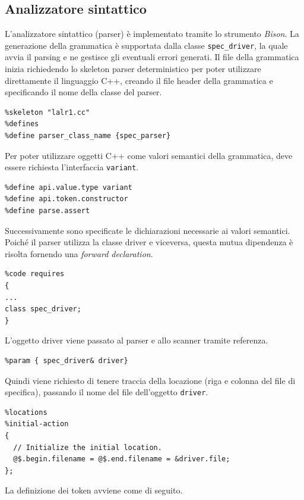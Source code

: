 \subsection{Analizzatore sintattico}
L'analizzatore sintattico (parser) è implementato tramite lo strumento \emph{Bison}. La generazione della grammatica è supportata dalla classe \verb|spec_driver|, la quale avvia il parsing e ne gestisce gli eventuali errori generati.
Il file della grammatica inizia richiedendo lo skeleton parser deterministico per poter utilizzare direttamente il linguaggio C++, creando il file header della grammatica e specificando il nome della classe del parser.

\begin{verbatim}
%skeleton "lalr1.cc"
%defines
%define parser_class_name {spec_parser}
\end{verbatim}

Per poter utilizzare oggetti C++ come valori semantici della grammatica, deve essere richiesta l'interfaccia \verb|variant|.

\begin{verbatim}
%define api.value.type variant
%define api.token.constructor
%define parse.assert
\end{verbatim}
 
Successivamente sono specificate le dichiarazioni necessarie ai valori semantici. Poiché il parser utilizza la classe driver e viceversa, questa mutua dipendenza è risolta fornendo una \emph{forward declaration}. 

\begin{verbatim}
%code requires
{
...
class spec_driver;
}
\end{verbatim}

L'oggetto driver viene passato al parser e allo scanner tramite referenza.

\begin{verbatim}
%param { spec_driver& driver}
\end{verbatim}

Quindi viene richiesto di tenere traccia della locazione (riga e colonna del file di specifica), passando il nome del file dell'oggetto \verb|driver|.

\begin{verbatim}
%locations
%initial-action
{
  // Initialize the initial location.
  @$.begin.filename = @$.end.filename = &driver.file;
};
\end{verbatim}

La definizione dei token avviene come di seguito.

